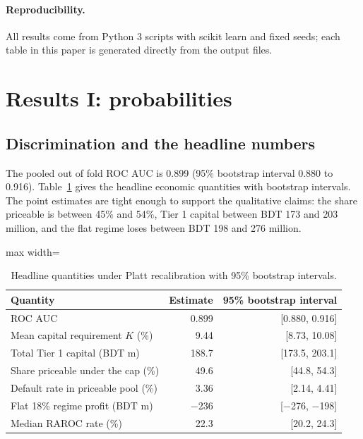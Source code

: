 \documentclass[11pt,a4paper]{article}
\newcommand{\tabsize}{\footnotesize}
\begin{document}
\paragraph{Reproducibility.} All results come from Python 3 scripts with scikit learn \citep{Pedregosa2011} and fixed seeds; each table in this paper is generated directly from the output files.

\section{Results I: probabilities}\label{sec:prob}
\subsection{Discrimination and the headline numbers}\label{sec:headline}
The pooled out of fold ROC AUC is 0.899 (95\% bootstrap interval 0.880 to 0.916). Table~\ref{tab:ci} gives the headline economic quantities with bootstrap intervals. The point estimates are tight enough to support the qualitative claims: the share priceable is between 45\% and 54\%, Tier 1 capital between BDT 173 and 203 million, and the flat regime loses between BDT 198 and 276 million.
\begin{table}[H]\centering\tabsize\caption{Headline quantities under Platt recalibration with 95\% bootstrap intervals.}\label{tab:ci}
\begin{adjustbox}{max width=\textwidth}
\begin{tabular}{lrr}
\toprule
Quantity & Estimate & 95\% bootstrap interval \\
\midrule
ROC AUC & 0.899 & [0.880, 0.916] \\
Mean capital requirement $K$ (\%) & 9.44 & [8.73, 10.08] \\
Total Tier 1 capital (BDT m) & 188.7 & [173.5, 203.1] \\
Share priceable under the cap (\%) & 49.6 & [44.8, 54.3] \\
Default rate in priceable pool (\%) & 3.36 & [2.14, 4.41] \\
Flat 18\% regime profit (BDT m) & $-$236 & [$-$276, $-$198] \\
Median RAROC rate (\%) & 22.3 & [20.2, 24.3] \\
\bottomrule
\end{tabular}
\end{adjustbox}\end{table}
\end{document}
